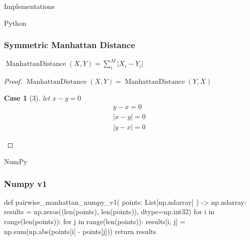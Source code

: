 \documentclass{beamer}
\theoremstyle{case}
\newtheorem{case}{Case}
\DeclareMathOperator{\md}{Manhattan Distance}
\begin{document}
\begin{section}{Implementations}
\begin{subsection}{Python}
\begin{frame}
    \frametitle{Symmetric Manhattan Distance}
    \begin{center}
    $\md(X, Y) = \sum_i^M | X_i - Y_i |$
    \end{center}
    \begin{proof}
        $\md(X, Y) = \md(Y,X)$
        \begin{case}[3]
            let $x - y = 0$
            \begin{align*}
                y - x = 0 \\
                |x - y| = 0 \\
                |y - x| = 0
            \end{align*}
        \end{case}
    \end{proof}
\end{frame}


\end{subsection} %

\begin{subsection}{NumPy}

\begin{frame}[fragile]
    \frametitle{Numpy v1}

    \begin{pythoncode}
def pairwise_manhattan_numpy_v1(
    points: List[np.ndarray]
) -> np.ndarray:
    results = np.zeros((len(points), len(points)), dtype=np.int32)
    for i in range(len(points)):
        for j in range(len(points)):
            results[i, j] = np.sum(np.abs(points[i] - points[j]))
    return results
    \end{pythoncode}
\end{frame}


\end{subsection}
\end{section}
\end{document}
